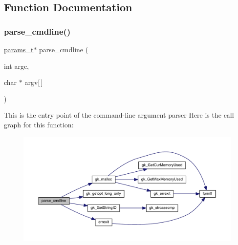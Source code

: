 \subsection{Function Documentation}
\mbox{\label{a00299_a0e7ce196a2f8882777957bf898739f6f}} 
\subsubsection{\texorpdfstring{parse\+\_\+cmdline()}{parse\_cmdline()}}
{\footnotesize\ttfamily \hyperlink{a00706}{params\+\_\+t}$\ast$ parse\+\_\+cmdline (\begin{DoxyParamCaption}\item[{int}]{argc,  }\item[{char $\ast$}]{argv\mbox{[}$\,$\mbox{]} }\end{DoxyParamCaption})}

This is the entry point of the command-\/line argument parser Here is the call graph for this function\+:\nopagebreak
\begin{figure}[H]
\begin{center}
\leavevmode
\includegraphics[width=350pt]{a00299_a0e7ce196a2f8882777957bf898739f6f_cgraph}
\end{center}
\end{figure}
